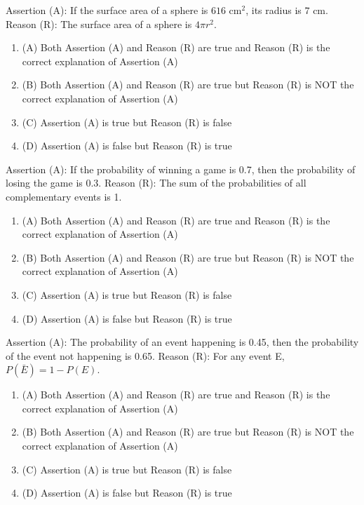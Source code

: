 \documentclass[12pt,a4paper]{exam}
\begin{document}
\begin{questions}
\question[1] Assertion (A): If the surface area of a sphere is $616 \text{ cm}^2$, its radius is $7 \text{ cm}$. Reason (R): The surface area of a sphere is $4\pi r^2$.
\begin{enumerate}[label=(\Alph*)]
  \item (A) Both Assertion (A) and Reason (R) are true and Reason (R) is the correct explanation of Assertion (A)
  \item (B) Both Assertion (A) and Reason (R) are true but Reason (R) is NOT the correct explanation of Assertion (A)
  \item (C) Assertion (A) is true but Reason (R) is false
  \item (D) Assertion (A) is false but Reason (R) is true
\end{enumerate}
\vspace{0.15cm}

\question[1] Assertion (A): If the probability of winning a game is 0.7, then the probability of losing the game is 0.3. Reason (R): The sum of the probabilities of all complementary events is 1.
\begin{enumerate}[label=(\Alph*)]
  \item (A) Both Assertion (A) and Reason (R) are true and Reason (R) is the correct explanation of Assertion (A)
  \item (B) Both Assertion (A) and Reason (R) are true but Reason (R) is NOT the correct explanation of Assertion (A)
  \item (C) Assertion (A) is true but Reason (R) is false
  \item (D) Assertion (A) is false but Reason (R) is true
\end{enumerate}
\vspace{0.15cm}

\question[1] Assertion (A): The probability of an event happening is 0.45, then the probability of the event not happening is 0.65. Reason (R): For any event E, $P(\bar{E}) = 1 - P(E)$.
\begin{enumerate}[label=(\Alph*)]
  \item (A) Both Assertion (A) and Reason (R) are true and Reason (R) is the correct explanation of Assertion (A)
  \item (B) Both Assertion (A) and Reason (R) are true but Reason (R) is NOT the correct explanation of Assertion (A)
  \item (C) Assertion (A) is true but Reason (R) is false
  \item (D) Assertion (A) is false but Reason (R) is true
\end{enumerate}
\vspace{0.15cm}


\end{questions}
\end{document}
